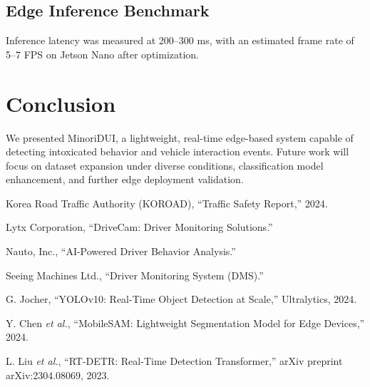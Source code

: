 \documentclass[conference]{IEEEtran}
\begin{document}
\subsection{Edge Inference Benchmark}
Inference latency was measured at 200--300 ms, with an estimated frame rate of 5--7 FPS on Jetson Nano after optimization.

\section{Conclusion}
We presented MinoriDUI, a lightweight, real-time edge-based system capable of detecting intoxicated behavior and vehicle interaction events. Future work will focus on dataset expansion under diverse conditions, classification model enhancement, and further edge deployment validation.

\begin{thebibliography}{1}

Korea Road Traffic Authority (KOROAD), ``Traffic Safety Report,'' 2024.

Lytx Corporation, ``DriveCam: Driver Monitoring Solutions.''

Nauto, Inc., ``AI-Powered Driver Behavior Analysis.''

Seeing Machines Ltd., ``Driver Monitoring System (DMS).''

G. Jocher, ``YOLOv10: Real-Time Object Detection at Scale,'' Ultralytics, 2024.

Y. Chen \textit{et al.}, ``MobileSAM: Lightweight Segmentation Model for Edge Devices,'' 2024.

L. Liu \textit{et al.}, ``RT-DETR: Real-Time Detection Transformer,'' arXiv preprint arXiv:2304.08069, 2023.

\end{thebibliography}
\end{document}
